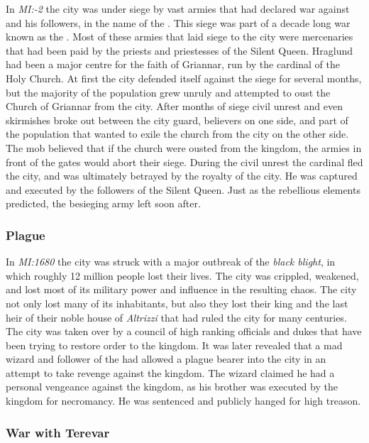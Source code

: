 In \emph{MI:-2} the city was under siege by vast armies that had declared war
against  and his followers, in the name of the
. This siege was part of a decade long war known as
the . Most of these armies that laid siege to the
city were mercenaries that had been paid by the priests and priestesses of the
Silent Queen. Hraglund had been a major centre for the faith of Griannar, run
by the cardinal of the Holy Church. At first the city defended itself against
the siege for several months, but the majority of the population grew unruly
and attempted to oust the Church of Griannar from the city. After months of
siege civil unrest and even skirmishes broke out between the city guard,
believers on one side, and part of the population that wanted to exile the
church from the city on the other side. The mob believed that if the church
were ousted from the kingdom, the armies in front of the gates would abort
their siege. During the civil unrest the cardinal fled the city, and was
ultimately betrayed by the royalty of the city. He was captured and executed
by the followers of the Silent Queen. Just as the rebellious elements
predicted, the besieging army left soon after.

\subsubsection{Plague}
\label{sec:Plague of Hraglund}

In \emph{MI:1680} the city was struck with a major outbreak of the \emph{black
  blight}, in which roughly 12 million people lost their lives. The city was
crippled, weakened, and lost most of its military power and influence in the
resulting chaos. The city not only lost many of its inhabitants, but also they
lost their king and the last heir of their noble house of \emph{Altrizzi} that
had ruled the city for many centuries. The city was taken over by a council of
high ranking officials and dukes that have been trying to restore order to the
kingdom. It was later revealed that a mad wizard and follower of the
 had allowed a plague bearer into the city in an attempt to
take revenge against the kingdom. The wizard claimed he had a personal
vengeance against the kingdom, as his brother was executed by the kingdom for
necromancy. He was sentenced and publicly hanged for high treason.

\subsubsection{War with Terevar}
\label{sec:Terevar}

